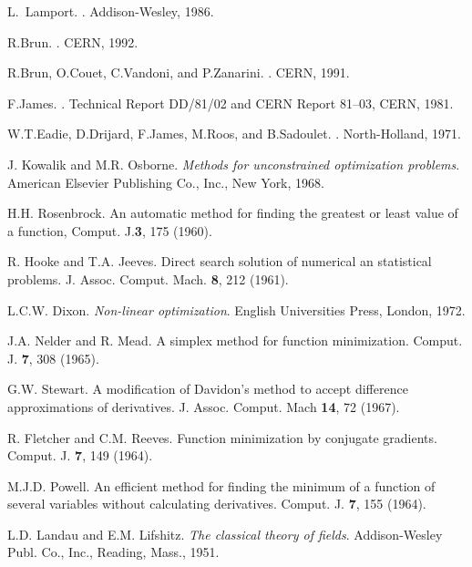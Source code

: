 \begin{thebibliography}{11}

L.~Lamport.
.
\newblock Addison-Wesley, 1986.

R.Brun.
.
\newblock CERN, 1992.

R.Brun, O.Couet, C.Vandoni, and P.Zanarini.
.
\newblock CERN, 1991.

F.James.
.
\newblock Technical Report DD/81/02 and CERN Report 81--03, CERN, 1981.

W.T.Eadie, D.Drijard, F.James, M.Roos, and B.Sadoulet.
.
\newblock North-Holland, 1971.

J. Kowalik and M.R. Osborne. 
{\it Methods for unconstrained optimization problems}. 
American Elsevier Publishing Co., Inc., New York, 1968.

H.H. Rosenbrock. 
An automatic method for finding the greatest or least value of a function, 
Comput. J.{\bf 3}, 175 (1960).

R. Hooke and T.A. Jeeves. 
Direct search solution of numerical an statistical problems.
J. Assoc. Comput. Mach. {\bf 8}, 212 (1961).

L.C.W. Dixon. 
{\it Non-linear optimization}.
English Universities Press, London, 1972.

J.A. Nelder and R. Mead. 
A simplex method for function minimization.
Comput. J. {\bf 7}, 308 (1965).

G.W. Stewart. 
A modification of Davidon's method to accept difference approximations 
      of derivatives. 
J. Assoc. Comput. Mach {\bf 14}, 72 (1967).

R. Fletcher and C.M. Reeves. 
Function minimization by conjugate gradients. 
Comput. J. {\bf 7}, 149 (1964).

M.J.D. Powell. 
An efficient method for finding the minimum of a
        function of several variables without calculating derivatives.
Comput. J. {\bf 7}, 155 (1964).

L.D. Landau and E.M. Lifshitz. 
{\it The classical theory of fields}.
Addison-Wesley Publ. Co., Inc., Reading, Mass., 1951.


\end{thebibliography}
